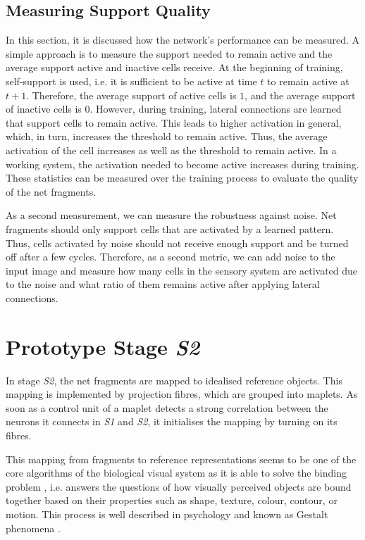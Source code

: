 \subsection{Measuring Support Quality}
In this section, it is discussed how the network's performance can be measured.
A simple approach is to measure the support needed to remain active and the average support active and inactive cells receive.
At the beginning of training, self-support is used, i.e. it is sufficient to be active at time $t$ to remain active at $t+1$.
Therefore, the average support of active cells is $1$, and the average support of inactive cells is $0$.
However, during training, lateral connections are learned that support cells to remain active.
This leads to higher activation in general, which, in turn, increases the threshold to remain active.
Thus, the average activation of the cell increases as well as the threshold to remain active.
In a working system, the activation needed to become active increases during training.
These statistics can be measured over the training process to evaluate the quality of the net fragments.

As a second measurement, we can measure the robustness against noise.
Net fragments should only support cells that are activated by a learned pattern. Thus, cells activated by noise should not receive enough support and be turned off after a few cycles.
Therefore, as a second metric, we can add noise to the input image and measure how many cells in the sensory system are activated due to the noise and what ratio of them remains active after applying lateral connections.


\section{Prototype Stage \emph{S2}}
In stage \emph{S2}, the net fragments are mapped to idealised reference objects.
This mapping is implemented by projection fibres, which are grouped into maplets.
As soon as a control unit of a maplet detects a strong correlation between the neurons it connects in \emph{S1} and \emph{S2}, it initialises the mapping by turning on its fibres.

This mapping from fragments to reference representations seems to be one of the core algorithms of the biological visual system as it is able to solve the binding problem , i.e. answers the questions of how visually perceived objects are bound together based on their properties such as shape, texture, colour, contour, or motion. This process is well described in psychology and known as Gestalt phenomena \cite{ellis_source_1938, kohler_gestalt_1992, wagemans_century_2012, hamlyn_psychology_2017}.

